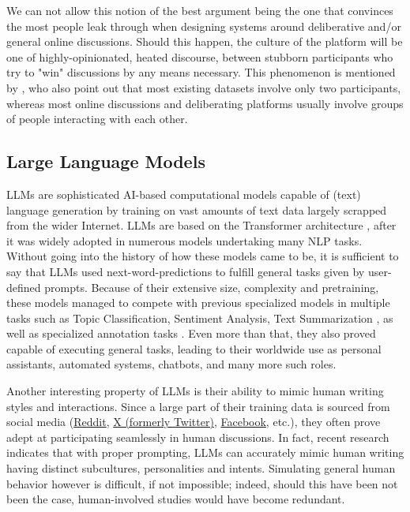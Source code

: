 We can not allow this notion of the best argument being the one that convinces the most people leak through when designing systems around deliberative and/or general online discussions. Should this happen, the culture of the platform will be one of highly-opinionated, heated discourse, between stubborn participants who try to "win" discussions by any means necessary. This phenomenon is mentioned by \citet{karadzhov2023delidata}, who also point out that most existing datasets involve only two participants, whereas most online discussions and deliberating platforms usually involve groups of people interacting with each other. 


\subsection{Large Language Models}
\label{sec:background:llm}

\acp{LLM} are sophisticated \ac{AI}-based computational models capable of (text) language generation by training on vast amounts of text data largely scrapped from the wider Internet. LLMs are based on the Transformer architecture \cite{vaswani2023attentionneed}, after it was widely adopted in numerous models undertaking many \ac{NLP} tasks. Without going into the history of how these models came to be, it is sufficient to say that LLMs used next-word-predictions to fulfill general tasks given by user-defined prompts. Because of their extensive size, complexity and pretraining, these models managed to compete with  previous specialized models in multiple tasks such as Topic Classification, Sentiment Analysis, Text Summarization \cite{ts2024}, as well as specialized annotation tasks \cite{tan2024largelanguagemodelsdata}.  Even more than that, they also proved capable of executing general tasks, leading to their worldwide use as personal assistants, automated systems, chatbots, and many more such roles. 

Another interesting property of LLMs is their ability to mimic human writing styles and interactions. Since a large part of their training data is sourced from social media (\href{https://www.reddit.com}{Reddit}, \href{https://www.twitter.com}{X (formerly Twitter)}, \href{https://www.facebook.com}{Facebook}, etc.), they often prove adept at participating seamlessly in human discussions. In fact, recent research \cite{Vezhnevets2023GenerativeAM, aher2023usinglargelanguagemodels} indicates that with proper prompting, LLMs can accurately mimic human writing having distinct subcultures, personalities and intents. Simulating general human behavior however is difficult, if not impossible; indeed, should this have been not been the case, human-involved studies would have become redundant.


